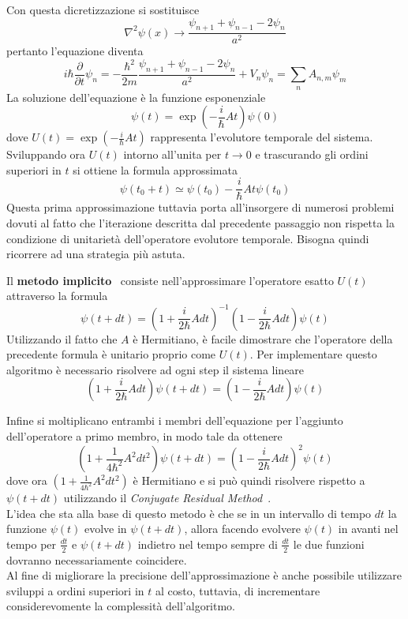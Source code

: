 Con questa dicretizzazione si sostituisce
$$\nabla^2\psi(x) \rightarrow \frac{\psi_{n+1}+\psi_{n-1}-2\psi_n}{a^2} $$
pertanto l'equazione diventa
$$i\hbar\frac{\partial}{\partial t} \psi_n = -\frac{\hbar^2}{2m}\frac{\psi_{n+1}+\psi_{n-1}-2\psi_n}{a^2} + V_n\psi_n = \sum\limits_{n}A_{n,m}\psi_m$$
La soluzione dell'equazione è la funzione esponenziale
$$\psi(t)=\exp\left(-\frac{i}{\hbar}At\right)\psi(0)$$
dove $U(t) = \exp(-\frac{i}{\hbar}At)$ rappresenta l'evolutore temporale del sistema. Sviluppando ora $U(t)$ intorno all'unita per $t\rightarrow 0$ e trascurando gli ordini superiori in $t$ si ottiene la formula approssimata
$$\psi(t_0+t)\simeq\psi(t_0)-\frac{i}{\hbar}At\psi(t_0)$$
Questa prima approssimazione tuttavia porta all'insorgere di numerosi problemi dovuti al fatto che l'iterazione descritta dal precedente passaggio non rispetta la condizione di unitarietà dell'operatore evolutore temporale. Bisogna quindi ricorrere ad una strategia più astuta.

Il \textbf{metodo implicito}~\cite{cinque} consiste nell'approssimare l'operatore esatto $U(t)$ attraverso la formula
$$\psi(t+dt)=(1+\frac{i}{2\hbar}Adt)^{-1}(1-\frac{i}{2\hbar}Adt)\psi(t)$$
Utilizzando il fatto che $A$ è Hermitiano, è facile dimostrare che l'operatore della precedente formula è unitario proprio come $U(t)$.
Per implementare questo algoritmo è necessario risolvere ad ogni step il sistema lineare
$$(1+\frac{i}{2\hbar}Adt)\psi(t+dt)=(1-\frac{i}{2\hbar}Adt)\psi(t)$$

Infine si moltiplicano entrambi i membri dell'equazione per l'aggiunto dell'operatore a primo membro, in modo tale da ottenere
$$(1+\frac{1}{4\hbar^2}A^2dt^2)\psi(t+dt)=(1-\frac{i}{2\hbar}Adt)^2\psi(t)$$
dove ora $(1+\frac{1}{4\hbar^2}A^2dt^2)$ è Hermitiano e si può quindi risolvere rispetto a $\psi(t+dt)$ utilizzando il \textit{Conjugate Residual Method}~\cite{tre}.\\

L'idea che sta alla base di questo metodo è che se in un intervallo di tempo $dt$ la funzione $\psi(t)$ evolve in $\psi(t+dt)$, allora facendo evolvere $\psi(t)$ in avanti nel tempo per $\frac{dt}{2}$ e $\psi(t+dt)$ indietro nel tempo sempre di $\frac{dt}{2}$ le due funzioni dovranno necessariamente coincidere.
\\

Al fine di migliorare la precisione dell'approssimazione è anche possibile utilizzare sviluppi a ordini superiori in $t$ al costo, tuttavia, di incrementare considerevomente la complessità dell'algoritmo.
\\

